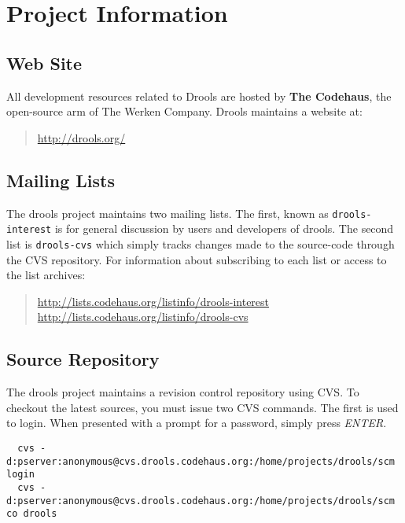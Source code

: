 \chapter{Project Information}


\section{Web Site}

All development resources related to Drools are hosted by 
\textbf{The Codehaus}, the open-source 
arm of The Werken Company. Drools maintains a website at:

\begin{quote}
	\url{http://drools.org/}
\end{quote}


\section{Mailing Lists}

The drools project maintains two mailing lists.  The first, known as
\verb|drools-interest| is for general discussion by users and
developers of drools.  The second list is \verb|drools-cvs| which
simply tracks changes made to the source-code through the CVS
repository. For information about subscribing to each list or access 
to the list archives:

\begin{quote}
    \url{http://lists.codehaus.org/listinfo/drools-interest}\\
    \url{http://lists.codehaus.org/listinfo/drools-cvs}
\end{quote}

\section{Source Repository}

The drools project maintains a revision control repository using
CVS.  To checkout the latest sources, you must issue two CVS commands.
The first is used to login.  When presented with a prompt for a
password, simply press \emph{ENTER}.

{\small
\begin{verbatim}
  cvs -d:pserver:anonymous@cvs.drools.codehaus.org:/home/projects/drools/scm login
  cvs -d:pserver:anonymous@cvs.drools.codehaus.org:/home/projects/drools/scm co drools
\end{verbatim}
}


